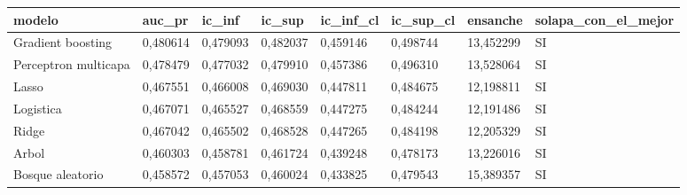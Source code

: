 \begin{tabular}{llllllll}
\toprule
modelo & auc\_pr & ic\_inf & ic\_sup & ic\_inf\_cl & ic\_sup\_cl & ensanche & solapa\_con\_el\_mejor \\
\midrule
Gradient boosting & 0{,}480614 & 0{,}479093 & 0{,}482037 & 0{,}459146 & 0{,}498744 & 13{,}452299 & SI \\
Perceptron multicapa & 0{,}478479 & 0{,}477032 & 0{,}479910 & 0{,}457386 & 0{,}496310 & 13{,}528064 & SI \\
Lasso & 0{,}467551 & 0{,}466008 & 0{,}469030 & 0{,}447811 & 0{,}484675 & 12{,}198811 & SI \\
Logistica & 0{,}467071 & 0{,}465527 & 0{,}468559 & 0{,}447275 & 0{,}484244 & 12{,}191486 & SI \\
Ridge & 0{,}467042 & 0{,}465502 & 0{,}468528 & 0{,}447265 & 0{,}484198 & 12{,}205329 & SI \\
Arbol & 0{,}460303 & 0{,}458781 & 0{,}461724 & 0{,}439248 & 0{,}478173 & 13{,}226016 & SI \\
Bosque aleatorio & 0{,}458572 & 0{,}457053 & 0{,}460024 & 0{,}433825 & 0{,}479543 & 15{,}389357 & SI \\
\bottomrule
\end{tabular}
